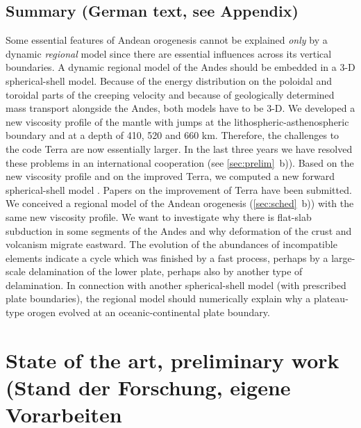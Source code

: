 \documentclass[twoside,10pt]{article}
\begin{document}
\subsection{Summary (German text, see Appendix)}
Some essential features of Andean orogenesis cannot be explained \emph{only} by a dynamic \emph{regional} model since there are essential influences across its vertical boundaries.
A dynamic regional model of the Andes should be embedded in a 3-D spherical-shell model. 
Because of the energy distribution on the poloidal and toroidal parts of the creeping velocity and because of geologically determined mass transport alongside the Andes, both models have to be 3-D. 
We developed a new viscosity profile of the mantle with jumps at the lithospheric-asthenospheric boundary and at a depth of 410, 520 and 660 km.
Therefore, the challenges to the code Terra are now essentially larger.
In the last three years we have resolved these problems in an international cooperation (see \ref{sec:prelim}~b)).
Based on the new viscosity profile and on the improved Terra, we computed a new forward spherical-shell model \cite{Walzer2012,Walzer2012b}. 
Papers on the improvement of Terra \cite{Koestler2012,Mueller2012} have been submitted. 
We conceived a regional model of the Andean orogenesis (\ref{sec:sched}~b)) with the same new viscosity profile. 
We want to investigate why there is flat-slab subduction in some segments of the Andes and why deformation of the crust and volcanism migrate eastward. 
The evolution of the abundances of incompatible elements indicate a cycle which was finished by a fast process, perhaps by a large-scale delamination of the lower plate, perhaps also by another type of delamination. 
In connection with another spherical-shell model (with prescribed plate boundaries), the regional model should numerically explain why a plateau-type orogen evolved at an oceanic-continental plate boundary.

%
%

\section{State of the art, preliminary work (Stand der Forschung, eigene Vorarbeiten}
\end{document}
